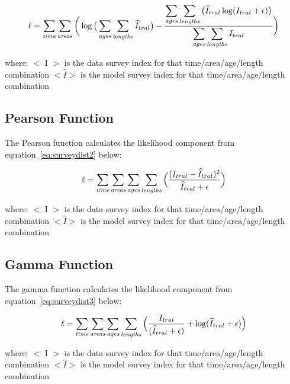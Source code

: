 \documentclass[10pt,twoside]{book}
\begin{document}
\begin{equation}\label{eq:surveydist1}
\ell = \sum_{\it time}\sum_{\it areas} \bigg( \log \big(\sum_{\it ages}\sum_{\it lengths} \widehat{I}_{tral} \big) - {\frac { \displaystyle \sum_{\it ages}\sum_{\it lengths} \big(\widehat{I}_{tral} \log (I_{tral} + \epsilon) \big)} { \displaystyle \sum_{\it ages}\sum_{\it lengths} I_{tral}} } \bigg)
\end{equation}

where:\newline
$<$ I $>$ is the data survey index for that time/area/age/length combination\newline
$<\widehat{I}>$ is the model survey index for that time/area/age/length combination

\subsection{Pearson Function}
The Pearson function calculates the likelihood component from equation~\ref{eq:surveydist2} below:

\begin{equation}\label{eq:surveydist2}
\ell = \sum_{\it time}\sum_{\it areas}\sum_{\it ages}\sum_{\it lengths} \Big( {\frac{ ( I_{tral} - \widehat{I}_{tral} ) ^2} {\widehat{I}_{tral} + \epsilon}} \Big)
\end{equation}

where:\newline
$<$ I $>$ is the data survey index for that time/area/age/length combination\newline
$<\widehat{I}>$ is the model survey index for that time/area/age/length combination

\subsection{Gamma Function}
The gamma function calculates the likelihood component from equation~\ref{eq:surveydist3} below:

\begin{equation}\label{eq:surveydist3}
\ell = \sum_{\it time}\sum_{\it areas}\sum_{\it ages}\sum_{\it lengths} \Big( {\frac{ I_{tral}} { (\widehat{I}_{tral} + \epsilon )} + \log ({\widehat{I}_{tral} + \epsilon}}) \Big)
\end{equation}

where:\newline
$<$ I $>$ is the data survey index for that time/area/age/length combination\newline
$<\widehat{I}>$ is the model survey index for that time/area/age/length combination
\end{document}
